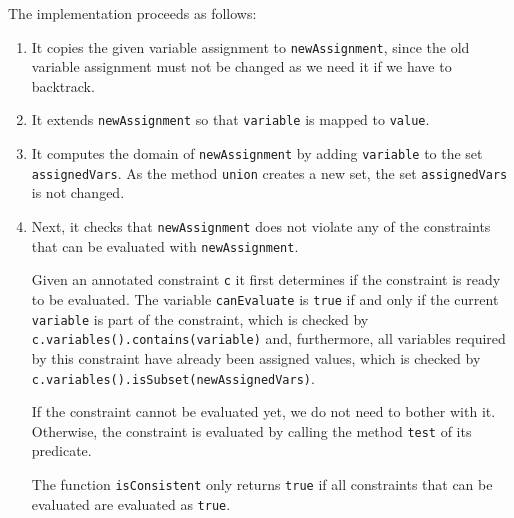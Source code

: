 \begin{enumerate}
  The implementation proceeds as follows:
  \begin{enumerate}
  \item It copies the given variable assignment to \texttt{newAssignment}, since the old variable assignment
        must not be changed as we need it if we have to backtrack.
  \item It extends \texttt{newAssignment} so that \texttt{variable} is mapped to \texttt{value}.
  \item It computes the domain of \texttt{newAssignment} by adding \texttt{variable} to the set
        \texttt{assignedVars}.  As the method \texttt{union} creates a new set, the set \texttt{assignedVars}
        is not changed.
  \item Next, it checks that \texttt{newAssignment} does not violate any of the constraints that can be
        evaluated with \texttt{newAssignment}.

        Given an annotated constraint \texttt{c} it first determines if the constraint is ready to be evaluated.
        The variable \texttt{canEvaluate} is \texttt{true} if and only if the current \texttt{variable} is part
        of the constraint, which is checked by \texttt{c.variables().contains(variable)} and, furthermore, all
        variables required by this constraint have already been assigned values, which is checked by
        \texttt{c.variables().isSubset(newAssignedVars)}.

        If the constraint cannot be evaluated yet, we do not need to bother with it.
        Otherwise, the constraint is evaluated by calling the method \texttt{test} of its predicate.

        The function \texttt{isConsistent} only returns \texttt{true} if all constraints that can be evaluated are evaluated
        as \texttt{true}.
  \end{enumerate}
\end{enumerate}      


